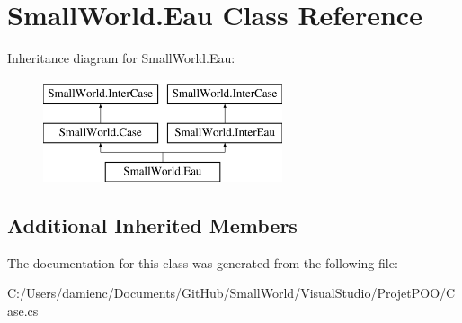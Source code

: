 \hypertarget{class_small_world_1_1_eau}{\section{Small\-World.\-Eau Class Reference}
\label{class_small_world_1_1_eau}
}
Inheritance diagram for Small\-World.\-Eau\-:\begin{figure}[H]
\begin{center}
\leavevmode
\includegraphics[height=3.000000cm]{class_small_world_1_1_eau}
\end{center}
\end{figure}
\subsection*{Additional Inherited Members}


The documentation for this class was generated from the following file\-:\begin{DoxyCompactItemize}
\item 
C\-:/\-Users/damienc/\-Documents/\-Git\-Hub/\-Small\-World/\-Visual\-Studio/\-Projet\-P\-O\-O/Case.\-cs\end{DoxyCompactItemize}
